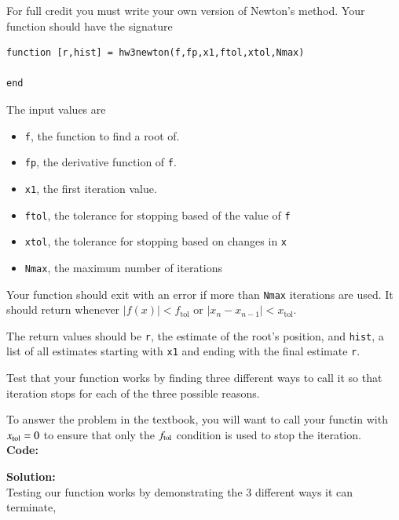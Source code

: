 \documentclass[12pt]{article}
\makeatletter
\theoremstyle{homework}
\newenvironment{exercise}[1]
{\def\@currentlabel{#1}\exercisecore}
{\endexercisecore}
\newcommand{\localhead}[1]{\par\smallskip\noindent\textbf{#1}\nobreak\\}%
\newcommand\solution{\localhead{Solution:}}
\makeatother
\begin{document}
\begin{exercise}{Chapter 4: 2 (b)}

For full credit you must write your own version of Newton's method.
Your function should have the signature

\begin{verbatim} 
function [r,hist] = hw3newton(f,fp,x1,ftol,xtol,Nmax)

end
\end{verbatim}

The input values are
\begin{itemize}
\item \texttt{f}, the function to find a root of.
\item \texttt{fp}, the derivative function of \texttt{f}.
\item \texttt{x1}, the first iteration value.
\item \texttt{ftol}, the tolerance for stopping based of the value of \texttt{f}
\item \texttt{xtol}, the tolerance for stopping based on changes in \texttt{x}
\item \texttt{Nmax}, the maximum number of iterations
\end{itemize}

Your function should exit with an error if more than \texttt{Nmax} iterations
are used.  It should return whenever $|f(x)|<f_{\text{tol}}$ or $|x_n-x_{n-1}|<x_{\text{tol}}$.

The return values should be \texttt{r}, the estimate of the root's position,
and \texttt{hist}, a list of all estimates starting with \texttt{x1} and ending with the final estimate \texttt{r}.

Test that your function works by finding three different ways to call it
so that iteration stops for each of the three possible reasons.

To answer the problem in the textbook, you will want to call your functin with 
$x_{\rm tol}=0$ to ensure that only the $f_{\rm tol}$ condition is used
to stop the iteration.\\

\textbf{Code:}



\solution
Testing our function works by demonstrating the 3 different ways it can terminate, \\


\end{exercise}
\end{document}
